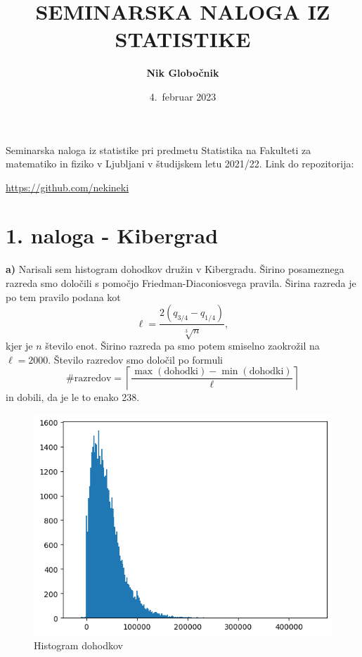 \documentclass[a4paper,11pt]{article}
\begin{document}
    
\author{\Large{\textbf{Nik Globočnik}}}
\title{SEMINARSKA NALOGA IZ STATISTIKE}
\date{4.~februar 2023}

\maketitle
\thispagestyle{empty}

\par
Seminarska naloga iz statistike pri predmetu Statistika na Fakulteti za matematiko in fiziko v Ljubljani v študijskem letu 2021/22. Link do repozitorija:
\begin{center}
    \url{https://github.com/nekineki} 
\end{center}

\section*{1. naloga - Kibergrad}
\noindent\textbf{a)} Narisali sem histogram dohodkov družin v Kibergradu. Širino posameznega razreda smo določili s pomočjo Friedman-Diaconiosvega pravila. Širina razreda je po tem pravilo podana kot
\[
    \ell = \frac{2(q_{3/4}-q_{1/4})}{\sqrt[3]{n}},
\]
kjer je $n$ število enot. Širino razreda pa smo potem smiselno zaokrožil na $\ell = 2000$. Število razredov smo določil po formuli
\[
    \#\text{razredov} = \left\lceil \frac{\max (\text{dohodki})-\min (\text{dohodki})}{\ell}\right\rceil
\]
in dobili, da je le to enako 238.
\newline 

\begin{figure}[H]
    \centering
    \includegraphics[scale = 0.5]{slike1/1_1.png}
    \caption{Histogram dohodkov}
\end{figure}
\end{document}
